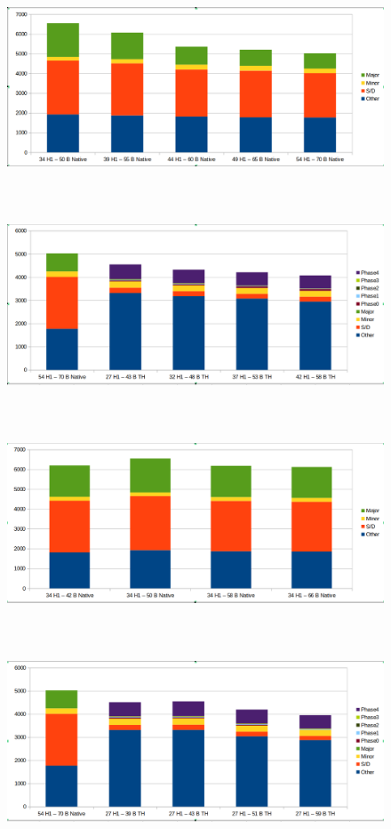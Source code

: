 \documentclass[twocolumn,10pt]{asme2e}
\begin{document}
\begin{figure}[h!]
        \includegraphics[width=12cm,height=6cm]{linr_h1_native.png}
\end{figure}

\begin{figure}[h!]
        \includegraphics[width=12cm,height=6cm]{linr_h1_th.png}
\end{figure}

\begin{figure}[h!]
        \includegraphics[width=12cm,height=6cm]{linr_pc_native.png}
\end{figure}

\begin{figure}[h!]
        \includegraphics[width=12cm,height=6cm]{linr_pc_th.png}
\end{figure}
\end{document}
